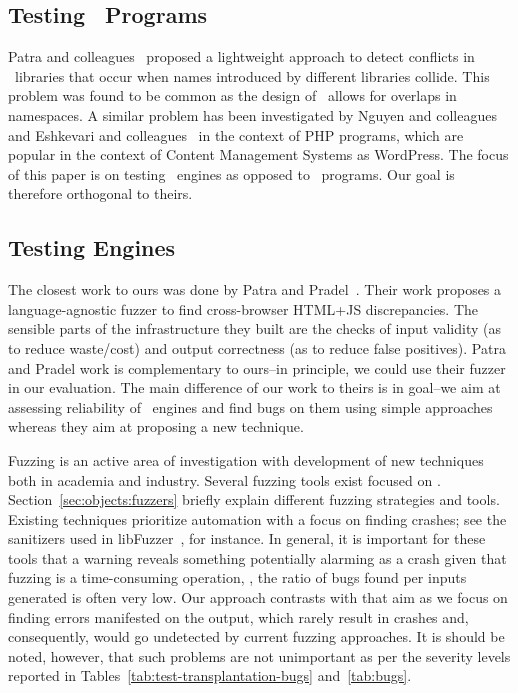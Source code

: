\documentclass[smallextended]{svjour3}
\begin{document}
\subsection{Testing \js\ Programs}
Patra and colleagues~\cite{Patra:2018:CFU:3180155.3180184} proposed a
lightweight approach to detect conflicts in \js\ libraries that occur
when names introduced by different libraries collide. This problem was
found to be common as the design of \js\ allows for overlaps in
namespaces. A similar problem has been investigated by Nguyen and
colleagues~\cite{nguyen-etal-icse2014} and Eshkevari and
colleagues~\cite{eshkevari-etal-icpc2014} in the context of PHP
programs, which are popular in the context of Content Management
Systems as WordPress. The focus of this paper is on testing
\js\ engines as opposed to \js\ programs. Our goal is therefore
orthogonal to theirs.

\subsection{Testing \js{} Engines}
\label{sec:testing-js-engines}
The closest work to ours was done by Patra and
Pradel~\cite{patra2016learning}. Their work proposes a
language-agnostic fuzzer to find cross-browser HTML+JS
discrepancies. The sensible parts of the infrastructure they
built are the checks of input validity (as to reduce waste/cost) and
output correctness (as to reduce false positives). Patra and Pradel
work is complementary to ours--in principle, we could use their fuzzer
in our evaluation. The main difference of our work to theirs is in
goal--we aim at assessing reliability of \js\ engines and find bugs on
them using simple approaches whereas they aim at proposing a new
technique.

Fuzzing is an active area of investigation with development of new
techniques both in academia and industry. Several fuzzing tools exist
focused on \js. Section~\ref{sec:objects:fuzzers} briefly explain
different fuzzing strategies and tools. Existing techniques prioritize
automation with a focus on finding crashes; see the sanitizers used in
libFuzzer~\cite{libfuzzer-tutorial}, for instance. In general, it is
important for these tools that a warning reveals something potentially
alarming as a crash given that fuzzing is a time-consuming operation,
\ie{}, the ratio of bugs found per inputs generated is often very low.
Our approach contrasts with that aim as we focus on finding errors
manifested on the output, which rarely result in crashes and,
consequently, would go undetected by current fuzzing approaches. It is
should be noted, however, that such problems are not unimportant as
per the severity levels reported in
Tables~\ref{tab:test-transplantation-bugs} and~\ref{tab:bugs}.
\end{document}
